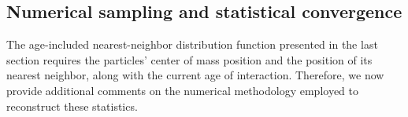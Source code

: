 \subsection{Numerical sampling and statistical convergence}

The age-included nearest-neighbor distribution function presented in the last section requires the particles' center of mass position and the position of its nearest neighbor, along with the current age of interaction.
Therefore, we now provide additional comments on the numerical methodology employed to reconstruct these statistics. 


